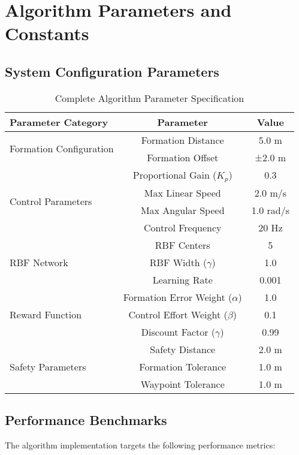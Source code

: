 \documentclass[11pt,a4paper]{article}
\begin{document}
\section{Algorithm Parameters and Constants}

\subsection{System Configuration Parameters}

\begin{table}[h!]
\centering
\caption{Complete Algorithm Parameter Specification}
\begin{tabular}{@{}lcc@{}}
\toprule
\textbf{Parameter Category} & \textbf{Parameter} & \textbf{Value} \\
\midrule
\multirow{2}{*}{Formation Configuration} & Formation Distance & 5.0 m \\
 & Formation Offset & ±2.0 m \\
\midrule
\multirow{4}{*}{Control Parameters} & Proportional Gain ($K_p$) & 0.3 \\
 & Max Linear Speed & 2.0 m/s \\
 & Max Angular Speed & 1.0 rad/s \\
 & Control Frequency & 20 Hz \\
\midrule
\multirow{3}{*}{RBF Network} & RBF Centers & 5 \\
 & RBF Width ($\gamma$) & 1.0 \\
 & Learning Rate & 0.001 \\
\midrule
\multirow{3}{*}{Reward Function} & Formation Error Weight ($\alpha$) & 1.0 \\
 & Control Effort Weight ($\beta$) & 0.1 \\
 & Discount Factor ($\gamma$) & 0.99 \\
\midrule
\multirow{3}{*}{Safety Parameters} & Safety Distance & 2.0 m \\
 & Formation Tolerance & 1.0 m \\
 & Waypoint Tolerance & 1.0 m \\
\bottomrule
\end{tabular}
\label{tab:complete_parameters}
\end{table}

\subsection{Performance Benchmarks}

The algorithm implementation targets the following performance metrics:
\end{document}

